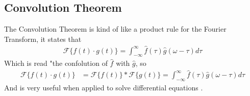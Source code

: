 \documentclass[12pt]{article}
\newcommand{\F}{\mathcal{F}}
\begin{document}
    \subsection{Convolution Theorem}
    The Convolution Theorem is kind of like a product rule for the Fourier Transform, it states that
    \begin{align}
        \F\{f(t)\cdot g(t)\} = \int_{-\infty}^{\infty} \hat{f}(\tau)\hat{g}(\omega-\tau)d\tau
    \end{align}
    Which is read "the confolution of $\hat{f}$ with $\hat{g}$, so
    \begin{align}
        \F\{f(t)\cdot g(t)\} &= \F\{f(t)\}*\F\{g(t)\} = \int_{-\infty}^{\infty}\hat{f}(\tau)\hat{g}(\omega-\tau)d\tau
    \end{align}
    And is very useful when applied to solve differential equations \cite{reed}.
\end{document}
